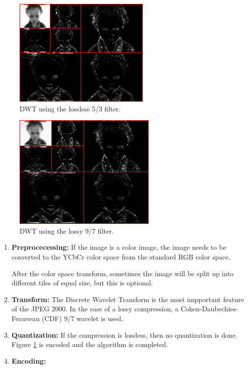 \documentclass{article}
\begin{document}
\begin{figure}
	\centering
	\includegraphics[scale=0.6]{resources/losslessbaby.png}
	\caption{DWT using the lossless 5/3 filter.}
	\label{fig:losslessbaby}
\end{figure}
\begin{figure}
	\centering
	\includegraphics[scale=0.6]{resources/lossybaby.png}
	\caption{DWT using the lossy 9/7 filter.}
	\label{fig:lossybaby}
\end{figure}

\begin{enumerate}
	
	\item\textbf{Preprocecessing:}
	If the image is a color image, the image needs to be converted to the YCbCr color space\cite{colorspace}
	from the standard RGB color space.

	After the color space transform, sometimes the image will be split up into different tiles of equal size,
	but this is optional.
	
	\item\textbf{Transform:}
	The Discrete Wavelet Transform is the most impportant feature of the JPEG 2000.
	In the case of a lossy compression, a Cohen-Daubechies-Feauveau (CDF) 9/7 wavelet is used.
	
	\item\textbf{Quantization:}
	If the compression is lossless, then no quantization is done.
	Figure \ref{fig:losslessbaby} is encoded and the algorithm is completed.
	
	\item\textbf{Encoding:}
	
\end{enumerate}
\end{document}
